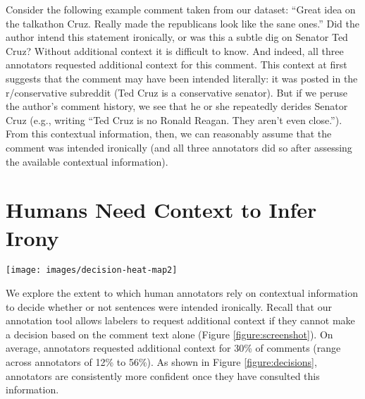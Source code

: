 \documentclass[11pt]{article}
\begin{document}
Consider the following example comment taken from our dataset: ``Great idea on the talkathon Cruz. Really made the republicans look like the sane ones.'' Did the author intend this statement ironically, or was this a subtle dig on Senator Ted Cruz? Without additional context it is difficult to know. And indeed, all three annotators requested additional context for this comment. This context at first suggests that the comment may have been intended literally: it was posted in the r/conservative subreddit (Ted Cruz is a conservative senator). But if we peruse the author's comment history, we see that he or she repeatedly derides Senator Cruz (e.g., writing ``Ted Cruz is no Ronald Reagan. They aren't even close.''). From this contextual information, then, we can reasonably assume that the comment was intended ironically (and all three annotators did so after assessing the available contextual information). 

\section{Humans Need Context to Infer Irony}
\label{section:humans}

\begin{figure*}
	\texttt{[image: images/decision-heat-map2]}
	\caption{This plot illustrates the effect of viewing contextual information for three annotators (one table for each annotator). For all comments for which these annotators requested context, we show \emph{forced} (before viewing the requested contextual content) and \emph{final} (after) decisions regarding perceived ironic intent on behalf of the author. Each row shows one of four possible decision sequences (e.g., a judgement of \emph{ironic} prior to seeing context and \emph{unironic} after). Numbers correspond to counts of these sequences for each annotator (e.g., the first annotator changed their mind from \emph{ironic} to \emph{unironic} 86 times). Cases that involve the annotator changing his or her mind are shown in red; those in which the annotator stuck with their initial judgement are shown in blue. Color intensity is proportional to the average confidence judgements the annotator provided: these are uniformly stronger after they have consulted contextualizing information. Note also that the context frequently results in annotators changing their judgement.}
	\label{figure:decisions}
\end{figure*}

We explore the extent to which human annotators rely on contextual information to decide whether or not sentences were intended ironically. Recall that our annotation tool allows labelers to request additional context if they cannot make a decision based on the  comment text alone (Figure \ref{figure:screenshot}). On average, annotators requested additional context for 30\% of comments (range across annotators of 12\% to 56\%). As shown in Figure \ref{figure:decisions}, annotators are consistently more confident once they have consulted this information.
\end{document}

